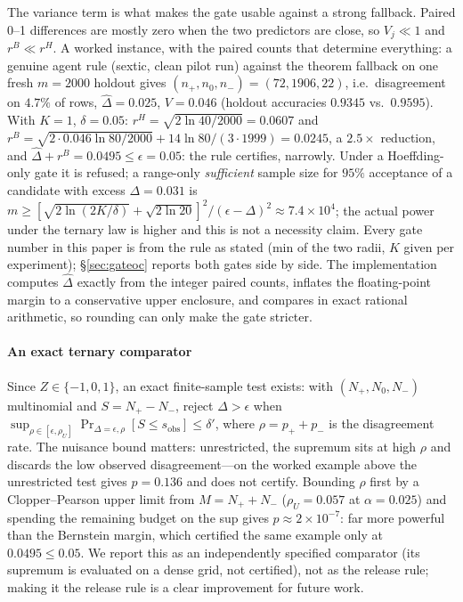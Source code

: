 \documentclass[conference]{IEEEtran}
\begin{document}
The variance term is what makes the gate usable against a strong
fallback. Paired 0--1 differences are mostly zero when the two
predictors are close, so $V_j\ll1$ and $r^B\ll r^H$. A worked
instance, with the paired counts that determine everything: a genuine
agent rule (sextic, clean pilot run) against the theorem fallback on
one fresh $m{=}2000$ holdout gives $(n_+,n_0,n_-)=(72,1906,22)$, i.e.\
disagreement on $4.7\%$ of rows, $\hat\Delta=0.025$, $V=0.046$
(holdout accuracies $0.9345$ vs.\ $0.9595$). With $K{=}1$,
$\delta{=}0.05$: $r^H=\sqrt{2\ln40/2000}=0.0607$ and
$r^B=\sqrt{2\cdot0.046\ln80/2000}+14\ln80/(3\cdot1999)=0.0245$, a
$2.5\times$ reduction, and $\hat\Delta+r^B=0.0495\le\epsilon=0.05$: the
rule certifies, narrowly. Under a Hoeffding-only gate it is refused; a
range-only \emph{sufficient} sample size for $95\%$ acceptance of a
candidate with excess $\Delta=0.031$ is
$m\ge[\sqrt{2\ln(2K/\delta)}+\sqrt{2\ln 20}]^2/(\epsilon-\Delta)^2
\approx7.4\times10^4$; the actual power under the ternary law is
higher and this is not a necessity claim. Every gate number in this
paper is from the rule as stated (min of the two radii, $K$ given per
experiment); \S\ref{sec:gateoc} reports both gates side by side. The
implementation computes $\hat\Delta$ exactly from the integer paired
counts, inflates the floating-point margin to a conservative upper
enclosure, and compares in exact rational arithmetic, so rounding can
only make the gate stricter.

\paragraph{An exact ternary comparator} Since $Z\in\{-1,0,1\}$, an
exact finite-sample test exists: with $(N_+,N_0,N_-)$ multinomial and
$S=N_+-N_-$, reject $\Delta>\epsilon$ when
$\sup_{\rho\in[\epsilon,\rho_U]}\Pr_{\Delta=\epsilon,\rho}[S\le s_{\mathrm{obs}}]\le\delta'$,
where $\rho=p_++p_-$ is the disagreement rate. The nuisance bound
matters: unrestricted, the supremum sits at high $\rho$ and discards
the low observed disagreement---on the worked example above the
unrestricted test gives $p=0.136$ and does not certify. Bounding
$\rho$ first by a Clopper--Pearson upper limit from $M=N_++N_-$
($\rho_U=0.057$ at $\alpha=0.025$) and spending the remaining budget on
the sup gives $p\approx2\times10^{-7}$: far more powerful than the
Bernstein margin, which certified the same example only at
$0.0495\le0.05$. We report this as an independently specified
comparator (its supremum is evaluated on a dense grid, not certified),
not as the release rule; making it the release rule is a clear
improvement for future work.
\end{document}
